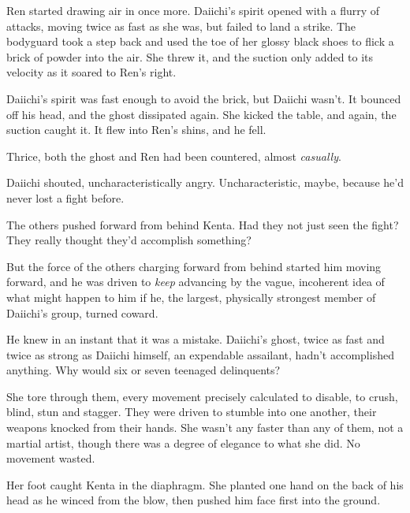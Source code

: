 Ren started drawing air in once more.  Daiichi's spirit opened with a flurry of attacks, moving twice as fast as she was, but failed to land a strike.  The bodyguard took a step back and used the toe of her glossy black shoes to flick a brick of powder into the air.  She threw it, and the suction only added to its velocity as it soared to Ren's right.



Daiichi's spirit was fast enough to avoid the brick, but Daiichi wasn't.  It bounced off his head, and the ghost dissipated again.  She kicked the table, and again, the suction caught it.  It flew into Ren's shins, and he fell.



Thrice, both the ghost and Ren had been countered, almost \emph{casually}.



Daiichi shouted, uncharacteristically angry.  Uncharacteristic, maybe, because he'd never lost a fight before.



The others pushed forward from behind Kenta.  Had they not just seen the fight?  They really thought they'd accomplish something?



But the force of the others charging forward from behind started him moving forward, and he was driven to \emph{keep} advancing by the vague, incoherent idea of what might happen to him if he, the largest, physically strongest member of Daiichi's group, turned coward.



He knew in an instant that it was a mistake.  Daiichi's ghost, twice as fast and twice as strong as Daiichi himself, an expendable assailant, hadn't accomplished anything.  Why would six or seven teenaged delinquents?



She tore through them, every movement precisely calculated to disable, to crush, blind, stun and stagger.  They were driven to stumble into one another, their weapons knocked from their hands.  She wasn't any faster than any of them, not a martial artist, though there was a degree of elegance to what she did.  No movement wasted.



Her foot caught Kenta in the diaphragm.  She planted one hand on the back of his head as he winced from the blow, then pushed him face first into the ground.



